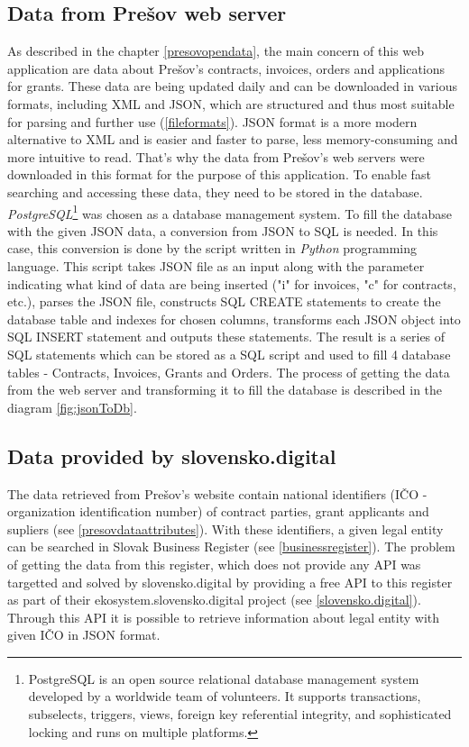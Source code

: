 \documentclass[thesis=B,english]{FITthesis}[2012/06/26]
\begin{document}
	\subsection{Data from Prešov web server}
	As described in the chapter \ref{presovopendata}, the main concern of this web application are data about Prešov's contracts, invoices, orders and applications for grants. These data are being updated daily and can be downloaded in various formats, including XML and JSON, which are structured and thus most suitable for parsing and further use (\ref{fileformats}). JSON format is a more modern alternative to XML and is easier and faster to parse, less memory-consuming and more intuitive to read. That's why the data from Prešov's web servers were downloaded in this format for the purpose of this application. To enable fast searching and accessing these data, they need to be stored in the database. \textit{PostgreSQL}\footnote{PostgreSQL is an open source relational database management system developed by a worldwide team of volunteers. It supports transactions, subselects, triggers, views, foreign key referential integrity, and sophisticated locking and runs on multiple platforms.} was chosen as a database management system. To fill the database with the given JSON data, a conversion from JSON to SQL is needed. In this case, this conversion is done by the script written in \textit{Python} programming language. This script takes JSON file as an input along with the parameter indicating what kind of data are being inserted ("i" for invoices, "c" for contracts, etc.), parses the JSON file, constructs SQL CREATE statements to create the database table and indexes for chosen columns, transforms each JSON object into SQL INSERT statement and outputs these statements. The result is a series of SQL statements which can be stored as a SQL script and used to fill 4 database tables - Contracts, Invoices, Grants and Orders. The process of getting the data from the web server and transforming it to fill the database is described in the diagram \ref{fig:jsonToDb}.

	\subsection{Data provided by slovensko.digital}
	\label{data-slovensko-digital}
	The data retrieved from Prešov's website contain national identifiers (IČO - organization identification number) of contract parties, grant applicants and supliers (see \ref{presovdataattributes}). With these identifiers, a given legal entity can be searched in Slovak Business Register (see \ref{businessregister}). The problem of getting the data from this register, which does not provide any API was targetted and solved by slovensko.digital by providing a free API to this register as part of their ekosystem.slovensko.digital project (see \ref{slovensko.digital}). Through this API it is possible to retrieve information about legal entity with given IČO in JSON format. 
	
\end{document}
